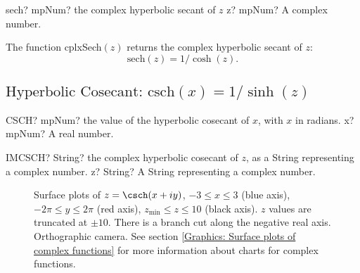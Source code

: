 \begin{mpFunctionsExtract}
	\mpFunctionOne
	{sech? mpNum? the complex hyperbolic secant of $z$}
	{z? mpNum? A complex number.}
\end{mpFunctionsExtract}


\vspace{0.3cm}
The function \textsf{cplxSech$(z)$} returns the complex hyperbolic secant of $z$: 
\begin{equation}
	\text{sech}(z) = 1/\cosh(z).
\end{equation}



\newpage
\subsection{\texorpdfstring{$\text{Hyperbolic Cosecant: csch}(x) = 1/\sinh(z)$}{csch}}

\begin{mpFunctionsExtract}
	\mpWorksheetFunctionOneNotImplemented
	{CSCH? mpNum? the value of the hyperbolic cosecant of $x$, with $x$ in radians.}
	{x? mpNum? A real number.}
\end{mpFunctionsExtract}

\vspace{0.6cm}
\begin{mpFunctionsExtract}
	\mpWorksheetFunctionOneNotImplemented
	{IMCSCH? String? the complex hyperbolic cosecant of $z$, as a String representing a complex number.}
	{z? String? A String representing a complex number.}
\end{mpFunctionsExtract}



\begin{figure}[ht]%
	\centering
	\qquad
	\caption[Complex Hyperbolic Cosecant]{Surface plots of $z = \csch(x + iy)$, $-3 \leq x \leq 3$ (blue axis), $-2 \pi \leq y \leq 2\pi$ (red axis), $z_{\text{min}} \leq z \leq 10$ (black axis). $z$ values are truncated at $\pm 10$. There is a branch cut along the negative real axis. Orthographic camera. See section \ref{Graphics: Surface plots of complex functions} for more information about charts for complex functions.} 
	\label{fig:Complex Hyperbolic Cosecant}%
\end{figure}




